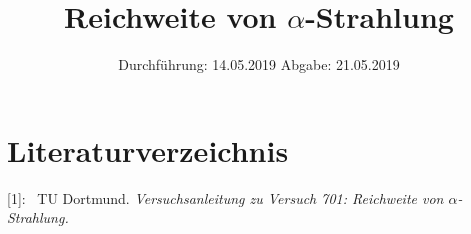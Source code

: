 

\subject{Nr.701}
\title{\texorpdfstring{Reichweite von $\alpha$-Strahlung}{Reichweite von Alpha-Strahlung}}
\date{%
  Durchführung: 14.05.2019
  \hspace{3em}
  Abgabe: 21.05.2019
}



\maketitle
\thispagestyle{empty}
\tableofcontents
\newpage






\section{Literaturverzeichnis}

[1]: \ TU Dortmund. \textit{Versuchsanleitung zu Versuch 701:
Reichweite von $\alpha$-Strahlung.}\newline

\printbibliography{}


